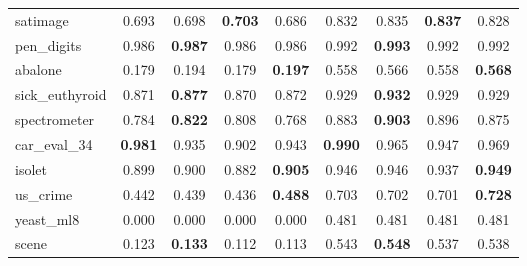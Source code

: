 \begin{figure}[ht]
\begin{tabular}{p{22mm}|*4{p{14mm}}|*4{p{14mm}}}
        satimage&\multicolumn{1}{c}{0.693}&\multicolumn{1}{c}{0.698}&\multicolumn{1}{c}{\textbf{0.703}}&\multicolumn{1}{c|}{0.686}&\multicolumn{1}{c}{0.832}&\multicolumn{1}{c}{0.835}&\multicolumn{1}{c}{\textbf{0.837}}&\multicolumn{1}{c}{0.828}\\
        pen\_digits&\multicolumn{1}{c}{0.986}&\multicolumn{1}{c}{\textbf{0.987}}&\multicolumn{1}{c}{0.986}&\multicolumn{1}{c|}{0.986}&\multicolumn{1}{c}{0.992}&\multicolumn{1}{c}{\textbf{0.993}}&\multicolumn{1}{c}{0.992}&\multicolumn{1}{c}{0.992}\\
        abalone&\multicolumn{1}{c}{0.179}&\multicolumn{1}{c}{0.194}&\multicolumn{1}{c}{0.179}&\multicolumn{1}{c|}{\textbf{0.197}}&\multicolumn{1}{c}{0.558}&\multicolumn{1}{c}{0.566}&\multicolumn{1}{c}{0.558}&\multicolumn{1}{c}{\textbf{0.568}}\\
        sick\_euthyroid&\multicolumn{1}{c}{0.871}&\multicolumn{1}{c}{\textbf{0.877}}&\multicolumn{1}{c}{0.870}&\multicolumn{1}{c|}{0.872}&\multicolumn{1}{c}{0.929}&\multicolumn{1}{c}{\textbf{0.932}}&\multicolumn{1}{c}{0.929}&\multicolumn{1}{c}{0.929}\\
        spectrometer&\multicolumn{1}{c}{0.784}&\multicolumn{1}{c}{\textbf{0.822}}&\multicolumn{1}{c}{0.808}&\multicolumn{1}{c|}{0.768}&\multicolumn{1}{c}{0.883}&\multicolumn{1}{c}{\textbf{0.903}}&\multicolumn{1}{c}{0.896}&\multicolumn{1}{c}{0.875}\\
        car\_eval\_34&\multicolumn{1}{c}{\textbf{0.981}}&\multicolumn{1}{c}{0.935}&\multicolumn{1}{c}{0.902}&\multicolumn{1}{c|}{0.943}&\multicolumn{1}{c}{\textbf{0.990}}&\multicolumn{1}{c}{0.965}&\multicolumn{1}{c}{0.947}&\multicolumn{1}{c}{0.969}\\
        isolet&\multicolumn{1}{c}{0.899}&\multicolumn{1}{c}{0.900}&\multicolumn{1}{c}{0.882}&\multicolumn{1}{c|}{\textbf{0.905}}&\multicolumn{1}{c}{0.946}&\multicolumn{1}{c}{0.946}&\multicolumn{1}{c}{0.937}&\multicolumn{1}{c}{\textbf{0.949}}\\
        us\_crime&\multicolumn{1}{c}{0.442}&\multicolumn{1}{c}{0.439}&\multicolumn{1}{c}{0.436}&\multicolumn{1}{c|}{\textbf{0.488}}&\multicolumn{1}{c}{0.703}&\multicolumn{1}{c}{0.702}&\multicolumn{1}{c}{0.701}&\multicolumn{1}{c}{\textbf{0.728}}\\
        yeast\_ml8&\multicolumn{1}{c}{0.000}&\multicolumn{1}{c}{0.000}&\multicolumn{1}{c}{0.000}&\multicolumn{1}{c|}{0.000}&\multicolumn{1}{c}{0.481}&\multicolumn{1}{c}{0.481}&\multicolumn{1}{c}{0.481}&\multicolumn{1}{c}{0.481}\\
        scene&\multicolumn{1}{c}{0.123}&\multicolumn{1}{c}{\textbf{0.133}}&\multicolumn{1}{c}{0.112}&\multicolumn{1}{c|}{0.113}&\multicolumn{1}{c}{0.543}&\multicolumn{1}{c}{\textbf{0.548}}&\multicolumn{1}{c}{0.537}&\multicolumn{1}{c}{0.538}\\

\end{tabular}
\end{figure}
